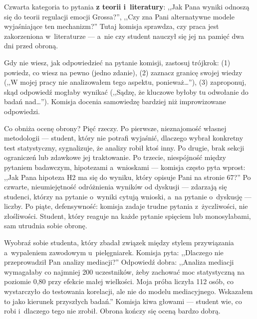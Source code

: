 \documentclass[12pt,a4paper,twoside,openany]{book}
\begin{document}
Czwarta kategoria to pytania \textbf{z teorii i~literatury}: ,,Jak Pana wyniki odnoszą się do teorii regulacji emocji Grossa?'', ,,Czy zna Pani alternatywne modele wyjaśniające ten mechanizm?'' Tutaj komisja sprawdza, czy praca jest zakorzeniona w~literaturze --- a~nie czy student nauczył się jej na pamięć dwa dni przed obroną.

\begin{tipbox}
Gdy nie wiesz, jak odpowiedzieć na pytanie komisji, zastosuj trójkrok: (1) powiedz, co wiesz na pewno (jedno zdanie), (2) zaznacz granicę swojej wiedzy (,,W mojej pracy nie analizowałem tego aspektu, ponieważ\ldots''), (3) zaproponuj, skąd odpowiedź mogłaby wynikać (,,Sądzę, że kluczowe byłoby tu odwołanie do badań nad\ldots''). Komisja docenia samowiedzę bardziej niż improwizowane odpowiedzi.
\end{tipbox}

Co obniża ocenę obrony? Pięć rzeczy. Po pierwsze, nieznajomość własnej metodologii --- student, który nie potrafi wyjaśnić, dlaczego wybrał konkretny test statystyczny, sygnalizuje, że analizy robił ktoś inny. Po drugie, brak sekcji ograniczeń lub zdawkowe jej traktowanie. Po trzecie, niespójność między pytaniem badawczym, hipotezami a~wnioskami --- komisja często pyta wprost: ,,Jak Pana hipoteza H2 ma się do wyniku, który opisuje Pani na stronie 67?'' Po czwarte, nieumiejętność odróżnienia wyników od dyskusji --- zdarzają się studenci, którzy na pytanie o~wyniki cytują wnioski, a~na pytanie o~dyskusję --- liczby. Po piąte, defensywność: komisja zadaje trudne pytania z~życzliwości, nie złośliwości. Student, który reaguje na każde pytanie spięciem lub monosylabami, sam utrudnia sobie obronę.

\begin{examplebox}
Wyobraź sobie studenta, który zbadał związek między stylem przywiązania a~wypaleniem zawodowym u~pielęgniarek. Komisja pyta: ,,Dlaczego nie przeprowadził Pan analizy mediacji?'' Odpowiedź dobra: ,,Analiza mediacji wymagałaby co najmniej 200 uczestników, żeby zachować moc statystyczną na poziomie 0,80 przy efekcie małej wielkości. Moja próba liczyła 112 osób, co wystarczyło do testowania korelacji, ale nie do modelu mediacyjnego. Wskazałem to jako kierunek przyszłych badań.'' Komisja kiwa głowami --- student wie, co robi i~dlaczego tego nie zrobił. Obrona kończy się oceną bardzo dobrą.
\end{examplebox}
\end{document}
